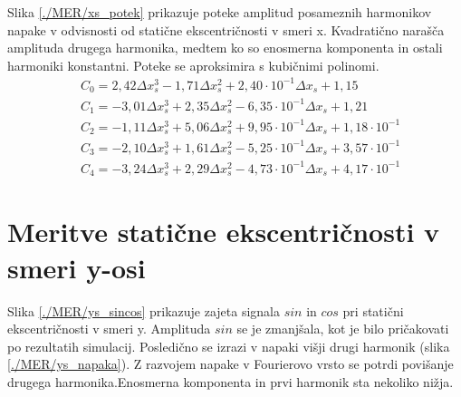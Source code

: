 Slika \ref{./MER/xs_potek} prikazuje poteke amplitud posameznih harmonikov napake v odvisnosti od statične ekscentričnosti v smeri x. Kvadratično narašča amplituda drugega harmonika, medtem ko so enosmerna komponenta in ostali harmoniki konstantni. Poteke se aproksimira s kubičnimi polinomi.
\begin{eqnarray}
&C_0 =2,42\Delta x_s^{3}-1,71\Delta x_s^{2}+2,40\cdot 10^{-1}\Delta x_s+1,15 \\              
&C_1 =-3,01\Delta x_s^{3}+2,35\Delta x_s^{2}-6,35\cdot 10^{-1}\Delta x_s+1,21 \\             
&C_2 =-1,11\Delta x_s^{3}+5,06\Delta x_s^{2}+9,95\cdot 10^{-1}\Delta x_s+1,18\cdot 10^{-1} \\
&C_3 =-2,10\Delta x_s^{3}+1,61\Delta x_s^{2}-5,25\cdot 10^{-1}\Delta x_s+3,57\cdot 10^{-1} \\
&C_4 =-3,24\Delta x_s^{3}+2,29\Delta x_s^{2}-4,73\cdot 10^{-1}\Delta x_s+4,17\cdot 10^{-1}
\end{eqnarray}
\section{Meritve statične ekscentričnosti v smeri y-osi}
Slika \ref{./MER/ys_sincos} prikazuje zajeta signala $sin$ in $cos$ pri statični ekscentričnosti v smeri y. Amplituda $sin$ se je zmanjšala, kot je bilo pričakovati po rezultatih simulacij. Posledično se izrazi v napaki višji drugi harmonik (slika \ref{./MER/ys_napaka}). Z razvojem napake v Fourierovo vrsto se potrdi povišanje drugega harmonika.Enosmerna komponenta in prvi harmonik sta nekoliko nižja.
\newpage

